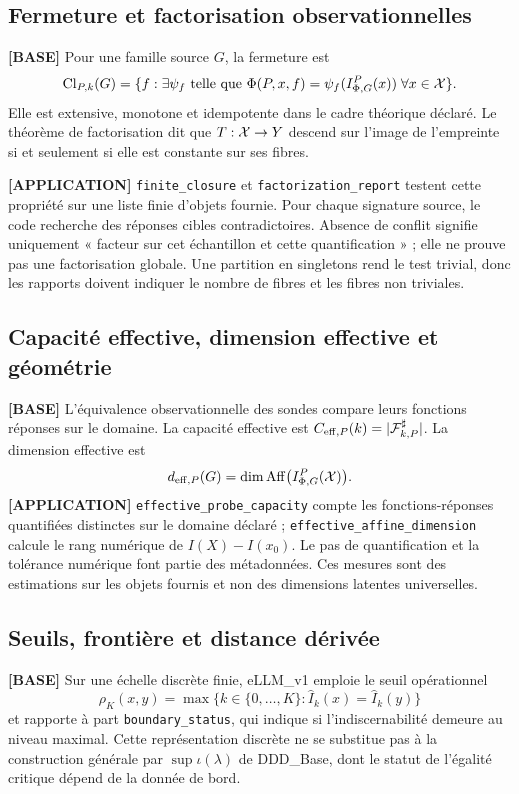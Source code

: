 \documentclass[11pt,a4paper]{article}
\begin{document}
\subsection{Fermeture et factorisation observationnelles}
\textbf{[BASE]} Pour une famille source \(G\), la fermeture est
\[
\operatorname{Cl}_{P,k}(G)=\{f:\exists\psi_f\text{ telle que }\Phi(P,x,f)=\psi_f(I_{\Phi,G}^P(x))\;\forall x\in\mathcal X\}.
\]
Elle est extensive, monotone et idempotente dans le cadre théorique déclaré. Le théorème de factorisation dit que \(T:\mathcal X\to Y\) descend sur l'image de l'empreinte si et seulement si elle est constante sur ses fibres.

\textbf{[APPLICATION]} \texttt{finite\_closure} et \texttt{factorization\_report} testent cette propriété sur une liste finie d'objets fournie. Pour chaque signature source, le code recherche des réponses cibles contradictoires. Absence de conflit signifie uniquement « facteur sur cet échantillon et cette quantification » ; elle ne prouve pas une factorisation globale. Une partition en singletons rend le test trivial, donc les rapports doivent indiquer le nombre de fibres et les fibres non triviales.

\subsection{Capacité effective, dimension effective et géométrie}
\textbf{[BASE]} L'équivalence observationnelle des sondes compare leurs fonctions réponses sur le domaine. La capacité effective est \(C_{\mathrm{eff},P}(k)=|\mathcal F_{k,P}^{\sharp}|\). La dimension effective est
\[
d_{\mathrm{eff},P}(G)=\dim\operatorname{Aff}\bigl(I_{\Phi,G}^P(\mathcal X)\bigr).
\]
\textbf{[APPLICATION]} \texttt{effective\_probe\_capacity} compte les fonctions-réponses quantifiées distinctes sur le domaine déclaré ; \texttt{effective\_affine\_dimension} calcule le rang numérique de \(I(X)-I(x_0)\). Le pas de quantification et la tolérance numérique font partie des métadonnées. Ces mesures sont des estimations sur les objets fournis et non des dimensions latentes universelles.

\subsection{Seuils, frontière et distance dérivée}
\textbf{[BASE]} Sur une échelle discrète finie, eLLM\_v1 emploie le seuil opérationnel
\[
\rho_K(x,y)=\max\{k\in\{0,\ldots,K\}:\widehat I_k(x)=\widehat I_k(y)\}
\]
et rapporte à part \texttt{boundary\_status}, qui indique si l'indiscernabilité demeure au niveau maximal. Cette représentation discrète ne se substitue pas à la construction générale par \(\sup\iota(\lambda)\) de DDD\_Base, dont le statut de l'égalité critique dépend de la donnée de bord.
\end{document}
